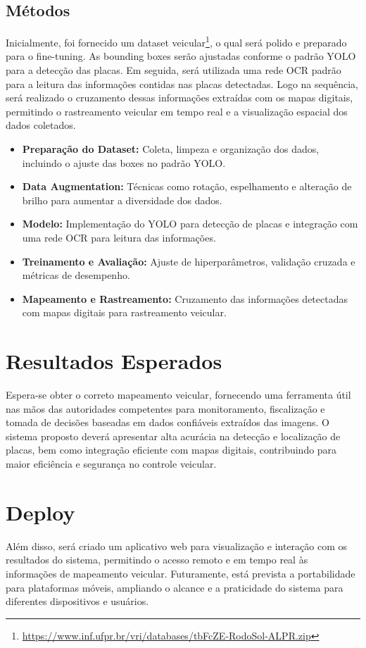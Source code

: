 \documentclass[a4paper,12pt]{article}
\begin{document}
\subsection{Métodos}
Inicialmente, foi fornecido um dataset veicular\footnote{\url{https://www.inf.ufpr.br/vri/databases/tbFcZE-RodoSol-ALPR.zip}}, o qual será polido e preparado para o fine-tuning. As bounding boxes serão ajustadas conforme o padrão YOLO para a detecção das placas. Em seguida, será utilizada uma rede OCR padrão para a leitura das informações contidas nas placas detectadas. Logo na sequência, será realizado o cruzamento dessas informações extraídas com os mapas digitais, permitindo o rastreamento veicular em tempo real e a visualização espacial dos dados coletados.

\begin{itemize}
    \item \textbf{Preparação do Dataset:} Coleta, limpeza e organização dos dados, incluindo o ajuste das boxes no padrão YOLO.
    \item \textbf{Data Augmentation:} Técnicas como rotação, espelhamento e alteração de brilho para aumentar a diversidade dos dados.
    \item \textbf{Modelo:} Implementação do YOLO para detecção de placas e integração com uma rede OCR para leitura das informações.
    \item \textbf{Treinamento e Avaliação:} Ajuste de hiperparâmetros, validação cruzada e métricas de desempenho.
    \item \textbf{Mapeamento e Rastreamento:} Cruzamento das informações detectadas com mapas digitais para rastreamento veicular.
\end{itemize}

\section{Resultados Esperados}
Espera-se obter o correto mapeamento veicular, fornecendo uma ferramenta útil nas mãos das autoridades competentes para monitoramento, fiscalização e tomada de decisões baseadas em dados confiáveis extraídos das imagens. O sistema proposto deverá apresentar alta acurácia na detecção e localização de placas, bem como integração eficiente com mapas digitais, contribuindo para maior eficiência e segurança no controle veicular.
\section{Deploy}
Além disso, será criado um aplicativo web para visualização e interação com os resultados do sistema, permitindo o acesso remoto e em tempo real às informações de mapeamento veicular. Futuramente, está prevista a portabilidade para plataformas móveis, ampliando o alcance e a praticidade do sistema para diferentes dispositivos e usuários.
\end{document}
